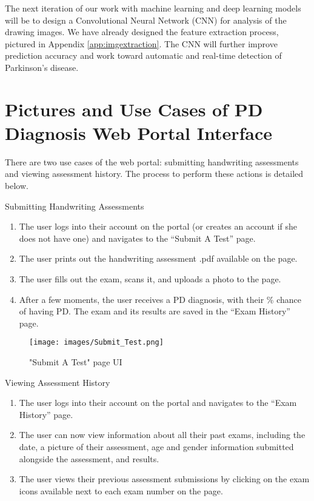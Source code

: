 \documentclass[pmlr,twocolumn,10pt,breaklinks, x11names,table]{jmlr} %
\def\UrlBreaks{\do\/\do-}
\newcommand\red[1]{{\color{red}#1}}
\begin{document}
The next iteration of our work with machine learning and deep learning models will be to design a Convolutional Neural Network (CNN) for analysis of the drawing images. We have already designed the feature extraction process, pictured in Appendix \ref{app:imgextraction}. The CNN will further improve prediction accuracy and work toward automatic and real-time detection of Parkinson’s disease. %

\clearpage



\nocite{*}
\justify{}

\clearpage
\appendix

\section{Pictures and Use Cases of PD Diagnosis Web Portal Interface}
\label{app:webportal}

There are two use cases of the web portal: submitting handwriting assessments and viewing assessment history. The process to perform these actions is detailed below.

Submitting Handwriting Assessments

\begin{enumerate}
\item The user logs into their account on the portal (or creates an account if she does not have one) and navigates to the “Submit A Test” page.
\item The user prints out the handwriting assessment .pdf available on the page.
\item 
The user fills out the exam, scans it, and uploads a photo to the page.
\item After a few moments, the user receives a PD diagnosis, with their \% chance of having PD. The exam and its results are saved in the “Exam History” page.
\end{enumerate}

\begin{figure}[h]
\label{fig:fig6}
\centering 
\texttt{[image: images/Submit\_Test.png]}
\caption{"Submit A Test" page UI}
\end{figure}

\vfill\eject

Viewing Assessment History

\begin{enumerate}
\item The user logs into their account on the portal and navigates to the “Exam History” page.
\item The user can now view information about all their past exams, including the date, a picture of their assessment, age and gender information submitted alongside the assessment, and results.
\item The user views their previous assessment submissions by clicking on the exam icons available next to each exam number on the page.
\end{enumerate}
\end{document}
